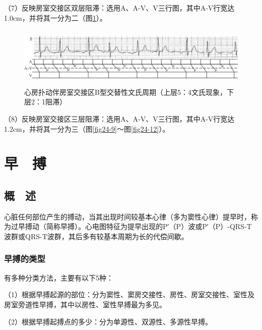 （7）反映房室交接区双层阻滞：选用A、A-V、V三行图，其中A-V行宽达1.0cm，并将其一分为二（图\ref{fig10-7}）。

\begin{figure}[!htbp]
 \centering
 \includegraphics[width=5.80208in,height=1.13542in]{./images/Image00151.jpg}
 \captionsetup{justification=centering}
 \caption{心房扑动伴房室交接区B型交替性文氏周期（上层5：4文氏现象，下层2：1阻滞）}
 \label{fig10-7}
  \end{figure} 

（8）反映房室交接区三层阻滞：选用A、A-V、V三行图，其中A-V行宽达1.2cm，并将其一分为三（图\ref{fig24-9}～图\ref{fig24-12}）。

\protect\hypertarget{text00018.html}{}{}

\protect\hypertarget{text00018.htmlux5cux23chapter18}{}{}

\chapter{早　搏}

\protect\hypertarget{text00018.htmlux5cux23subid124}{}{}

\section{概　述}

心脏任何部位产生的搏动，当其出现时间较基本心律（多为窦性心律）提早时，称为过早搏动（简称早搏）。心电图特征为提早出现的P′（P）波或P′（P）-QRS-T波群或QRS-T波群，其后多有较基本周期为长的代偿间歇。

\protect\hypertarget{text00018.htmlux5cux23subid125}{}{}

\subsection{早搏的类型}

有多种分类方法，主要有以下5种：

（1）根据早搏起源的部位：分为窦性、窦房交接性、房性、房室交接性、室性及房室旁道性早搏，其中以房性、室性早搏最为多见。

（2）根据早搏起搏点的多少：分为单源性、双源性、多源性早搏。


